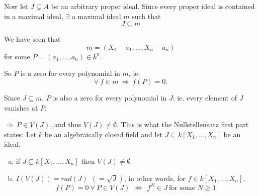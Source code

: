 \documentclass{article}
\theoremstyle{definition}
\newenvironment{thm}[1]
{\renewcommand\theinnerthm{#1}\innerthm}
{\endinnerthm}
\begin{document}
\vspace{0.5cm}
Now let $J\subsetneq A$ be an arbitrary proper ideal. Since every proper ideal is contained in a maximal ideal, $\exists$ a maximal ideal $m$ such that
$$J\subseteq m$$

We have seen that
$$m=(X_1-a_1, \ldots, X_n-a_n)$$
for some $P=(a_1,\ldots,a_n)\in k^n$.

So $P$ is a zero for every polynomial in $m$, ie.
$$\forall~ f \in m ~\Longrightarrow~ f(P)=0.$$

Since $J \subseteq m$, $P$ is also a zero for every polynomial in $J$; ie. every element of $J$ vanishes at $P$.

$\Longrightarrow~ P \in V(J)$, and thus $V(J) \neq \emptyset$. This is what the Nullstellensatz first part states:
\begin{thm}{5.6}[Nullstellensatz] \label{nullstellensatz-again}
  Let $k$ be an algebraically closed field and let $J\subseteq k[X_1,\ldots,X_n]$ be an ideal.
  \begin{enumerate}[a.]
    \item if $J \subsetneq k[X_1, \ldots, X_n]$ then $V(J) \neq \emptyset$
    \item $I(V(J)) = rad(J)~~(=\sqrt{J})$, in other words, for $f \in k[X_1, \ldots, X_n]$,
      $$f(P)=0 ~\forall~ P \in V(J) ~~\Longleftrightarrow~~ f^N \in J ~\text{for some $N\geq 1$.}$$
  \end{enumerate}
\end{thm}
\end{document}
